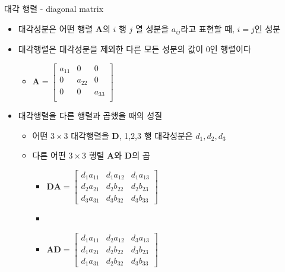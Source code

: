 \begin{frame}{대각 행렬 - diagonal matrix}

\begin{itemize}
\item 대각성분은 어떤 행렬 $\mathbf A$의 $i$ 행 $j$ 열 성분을 $a_{ij}$라고 표현할 때, $i=j$인 성분
\item 대각행렬은 대각성분을 제외한 다른 모든 성분의 값이 0인 행렬이다
	\begin{itemize}
	\item $\mathbf A = \left [ 
		\begin{array}{ccc}
		a_{11} & 0 & 0 \\
		0 & a_{22} & 0 \\
		0 & 0 & a_{33} \\
		\end{array}
		\right ]$
	\end{itemize}
\item 대각행렬을 다른 행렬과 곱했을 때의 성질
	\begin{itemize}
	\item 어떤 $3 \times 3$ 대각행렬을 $\mathbf D$, 1,2,3 행 대각성분은 $d_1, d_2, d_3$
	\item 다른 어떤 $3 \times 3$ 행렬 $\mathbf A$와 $\mathbf D$의 곱
		\begin{itemize}
		\item $\mathbf{DA} = \left [
			\begin{array}{ccc}
			d_1 a_{11} & d_1 a_{12} & d_1 a_{13} \\
			d_2 a_{21} & d_2 b_{22} & d_2 b_{23} \\
			d_3 a_{31} & d_3 b_{32} & d_3 b_{33} 
			\end{array}
			\right ]$
		\item 
		\item $\mathbf{AD} = \left [
			\begin{array}{ccc}
			d_1 a_{11} & d_2 a_{12} & d_3 a_{13} \\
			d_1 a_{21} & d_2 b_{22} & d_3 b_{23} \\
			d_1 a_{31} & d_2 b_{32} & d_3 b_{33}
			\end{array}
			\right ]$
		\end{itemize}
	\end{itemize}
\end{itemize}

\end{frame}


